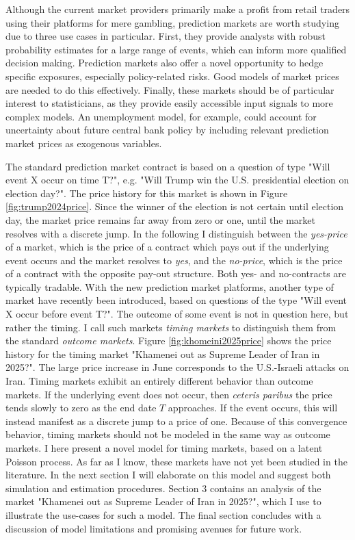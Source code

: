 \documentclass[a4paper, 12pt]{article}
\begin{document}
Although the current market providers primarily make a profit from retail traders using their platforms for mere gambling, prediction markets are worth studying due to three use cases in particular. First, they provide analysts with robust probability estimates for a large range of events, which can inform more qualified decision making. Prediction markets also offer a novel opportunity to hedge specific exposures, especially policy-related risks. Good models of market prices are needed to do this effectively. Finally, these markets should be of particular interest to statisticians, as they provide easily accessible input signals to more complex models. An unemployment model, for example, could account for uncertainty about future central bank policy by including relevant prediction market prices as exogenous variables.

The standard prediction market contract is based on a question of type "Will event X occur on time T?", e.g. "Will Trump win the U.S. presidential election on election day?". The price history for this market is shown in Figure \ref{fig:trump2024price}. Since the winner of the election is not certain until election day, the market price remains far away from zero or one, until the market resolves with a discrete jump. In the following I distinguish between the \textit{yes-price} of a market, which is the price of a contract which pays out if the underlying event occurs and the market resolves to \textit{yes}, and the \textit{no-price}, which is the price of a contract with the opposite pay-out structure. Both yes- and no-contracts are typically tradable. With the new prediction market platforms, another type of market have recently been introduced, based on questions of the type "Will event X occur before event T?". The outcome of some event is not in question here, but rather the timing. I call such markets \textit{timing markets} to distinguish them from the standard \textit{outcome markets}. Figure \ref{fig:khomeini2025price} shows the price history for the timing market "Khamenei out as Supreme Leader of Iran in 2025?". The large price increase in June corresponds to the U.S.-Israeli attacks on Iran. Timing markets exhibit an entirely different behavior than outcome markets. If the underlying event does not occur, then \textit{ceteris paribus} the price tends slowly to zero as the end date \(T\) approaches. If the event occurs, this will instead manifest as a discrete jump to a price of one. Because of this convergence behavior, timing markets should not be modeled in the same way as outcome markets. I here present a novel model for timing markets, based on a latent Poisson process. As far as I know, these markets have not yet been studied in the literature. In the next section I will elaborate on this model and suggest both simulation and estimation procedures. Section 3 contains an analysis of the market "Khamenei out as Supreme Leader of Iran in 2025?", which I use to illustrate the use-cases for such a model. The final section concludes with a discussion of model limitations and promising avenues for future work. 
\end{document}
